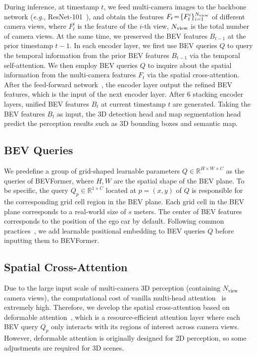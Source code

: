 \documentclass{article}
\def\eg{\emph{e.g.}}
\begin{document}
During inference, at timestamp $t$, we feed multi-camera 
images to the backbone network (\eg, 
ResNet-101~\cite{he2016deep}), and obtain the features 
$F_t\!=\!\{F_t^i\}_{i=1}^{N_{\rm view}}$ of different camera 
views, where $F_t^i$ is the feature of the $i$-th view, 
$N_{\rm view}$ is the total number of camera views. 
At the same time, we preserved the BEV features $B_{t\!-\!1}$ at the prior timestamp $ t\!-\!1$.
In each encoder layer, we first use BEV queries $Q$ to query the temporal information from the prior BEV features $B_{t\!-\!1}$ via the temporal self-attention.
We then employ BEV queries $Q$ to inquire about the spatial information from the multi-camera features $F_t$ via the spatial cross-attention. After the feed-forward network~\cite{vaswani2017attention}, the encoder layer output the refined BEV features, which is the input of the next encoder layer.
After 6 stacking encoder layers, unified BEV features $B_t$ at current timestamp $t$ are generated. Taking the BEV features $B_t$ as input, the 3D detection head and map segmentation head predict the  perception results such as 3D bounding boxes and semantic map.




\subsection{BEV Queries}\label{bev_queries}
We predefine a group of grid-shaped learnable parameters $Q\!\in\! \mathbb{R}^{H\!\times\!W\!\times\!C}$ as the queries of BEVFormer, where $H,W$ are the spatial shape of the BEV plane. 
To be specific, the query $Q_p\!\in\!\mathbb{R}^{1\!\times\!C} $ located at $p=(x,y)$ of $Q$ is responsible for the corresponding grid cell region in the BEV plane. 
Each grid cell in the BEV plane corresponds to a real-world size of $s$ meters. 
The center of BEV features corresponds to the position of the ego car by default.
Following common practices~\cite{gehring2017convolutional}, we add learnable positional embedding
to BEV queries $Q$ before inputting  them to BEVFormer. 


\subsection{Spatial Cross-Attention}\label{spatial_attention}
Due to the large input scale of multi-camera 3D perception (containing $N_\text{view}$ camera views), the computational cost of vanilla multi-head attention~\cite{vaswani2017attention} is extremely high.
Therefore, we develop the spatial cross-attention based on deformable attention~\cite{zhu2020deformable}, which is a resource-efficient attention layer where each BEV query $Q_p$ only interacts with its regions of interest  across camera views. 
However, deformable attention is originally designed for 2D perception, so some adjustments are required for 3D scenes.
\end{document}
